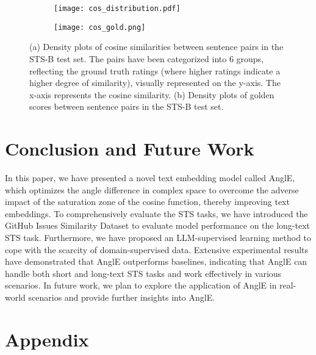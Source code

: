 \documentclass{article} \usepackage{iclr2024_conference,times}
\begin{document}
\begin{figure}
     \centering
     \begin{subfigure}[b]{0.45\textwidth}
         \centering
         \texttt{[image: cos\_distribution.pdf]}
         \caption{}
         \label{cos-sentence-distribution-figure}
     \end{subfigure}
     \hfill
     \begin{subfigure}[b]{0.53\textwidth}
         \centering
         \texttt{[image: cos\_gold.png]}
         \caption{}
         \label{cos-gold-distribution-figure}
     \end{subfigure}
     \caption{(a) Density plots of cosine similarities between sentence pairs in the STS-B test set. The pairs have been categorized into 6 groups, reflecting the ground truth ratings (where higher ratings indicate a higher degree of similarity), visually represented on the y-axis. The x-axis represents the cosine similarity. (b) Density plots of golden scores between sentence pairs in the STS-B test set.}
\end{figure}


\section{Conclusion and Future Work}
In this paper, we have presented a novel text embedding model called AnglE, which optimizes the angle difference in complex space to overcome the adverse impact of the saturation zone of the cosine function, thereby improving text embeddings. 
To comprehensively evaluate the STS tasks, we have introduced the GitHub Issues Similarity Dataset to evaluate model performance on the long-text STS task. Furthermore, we have proposed an LLM-supervised learning method to cope with the scarcity of domain-supervised data. Extensive experimental results have demonstrated that AnglE outperforms baselines, indicating that AnglE can handle both short and long-text STS tasks and work effectively in various scenarios. In future work, we plan to explore the application of AnglE in real-world scenarios and provide further insights into AnglE.




\appendix
\section{Appendix}
\end{document}
